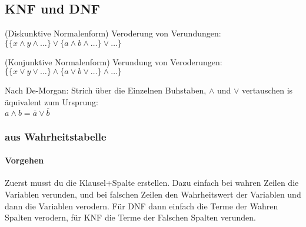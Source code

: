 \documentclass[
    ngerman,
    color=3b,
    summary,
    boxarc,
    main,
    fleqn,
    leqno,
]{rubos-tuda-template}
\begin{document}
    \subsection{KNF und DNF}
    \begin{definition}[DNF]\label{dnf} (Diskunktive Normalenform)
        Veroderung von Verundungen: $\{\{x\land y\land\dots\}\lor\{a\land b\land\dots\}\lor\dots\}$
    \end{definition}
    \begin{definition}[KNF]\label{knf} (Konjunktive Normalenform)
        Verundung von Veroderungen: $\{\{x\lor y\lor\dots\}\land\{a\lor b\lor\dots\}\land\dots\}$
    \end{definition}
    \begin{tipp}
        Nach De-Morgan: Strich über die Einzelnen Buhstaben, $\land$ und $\lor$ vertauschen is äquivalent zum Ursprung:\\ $a\land b = \overline{a}\lor \overline{b}$
    \end{tipp}
    \subsubsection{aus Wahrheitstabelle}
    \paragraph{Vorgehen} Zuerst musst du die Klausel+Spalte erstellen.
    Dazu einfach bei wahren Zeilen die Variablen verunden, und bei falschen Zeilen den Wahrheitswert der Variablen  und dann die Variablen verodern. Für DNF dann einfach die Terme der Wahren Spalten verodern, für KNF die Terme der Falschen Spalten verunden.
\end{document}
